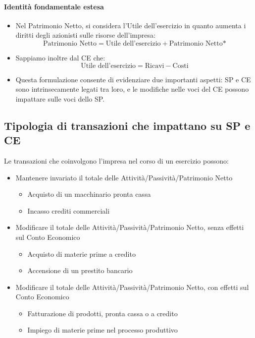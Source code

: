 \paragraph{Identità fondamentale estesa}
\begin{itemize}
    \item Nel Patrimonio Netto, si considera l’Utile dell’esercizio in quanto aumenta i
diritti degli azionisti sulle risorse dell’impresa:
\begin{equation*}
    \text{Patrimonio Netto} = \text{Utile dell’esercizio} + \text{Patrimonio Netto*}
\end{equation*}

\item Sappiamo inoltre dal CE che:
\begin{equation*}
    \text{Utile dell’esercizio} = \text{Ricavi} - \text{Costi}
\end{equation*}

\item Questa formulazione consente di evidenziare due importanti aspetti: SP e CE sono intrinsecamente legati tra loro,
e le modifiche nelle voci del CE possono impattare sulle voci dello SP.
\end{itemize}

\subsection{Tipologia di transazioni che impattano su SP e CE}
Le transazioni che coinvolgono l’impresa nel corso di un esercizio possono:
\begin{itemize}
    \item Mantenere invariato il totale delle Attività/Passività/Patrimonio Netto
    \begin{itemize}
        \item Acquisto di un macchinario pronta cassa
        \item Incasso crediti commerciali
    \end{itemize}
    \item Modificare il totale delle Attività/Passività/Patrimonio Netto, senza effetti
    sul Conto Economico
    \begin{itemize} 
        \item Acquisto di materie prime a credito
        \item Accensione di un prestito bancario
    \end{itemize}
    \item Modificare il totale delle Attività/Passività/Patrimonio Netto, con effetti
    sul Conto Economico
    \begin{itemize}
        \item Fatturazione di prodotti, pronta cassa o a credito
        \item Impiego di materie prime nel processo produttivo
    \end{itemize}
\end{itemize}

